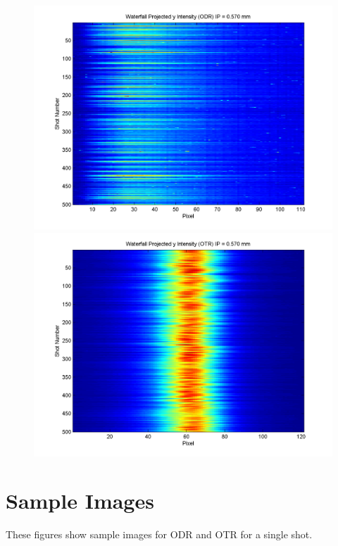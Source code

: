 \documentclass[12pt]{article}
\begin{document}
\begin{figure}
\begin{center}
\includegraphics[scale=0.5]{Figures/ProjY_wfall_ODR_570.PNG}
\includegraphics[scale=0.5]{Figures/ProjY_wfall_OTR_570.PNG}
\caption{}
\end{center}
\end{figure}



\newpage

\section{Sample Images}

These figures show sample images for ODR and OTR for a single shot.
\end{document}
